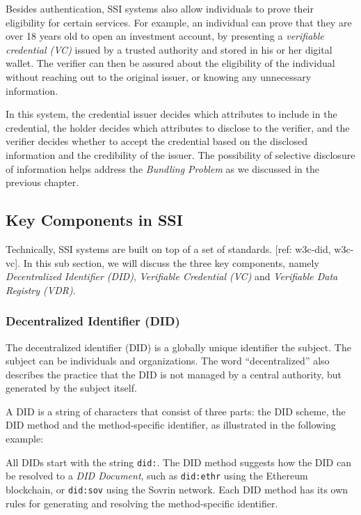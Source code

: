 \documentclass[
]{report}
\begin{document}
Besides authentication, SSI systems also allow individuals to prove their
eligibility for certain services. For example, an individual can prove
that they are over 18 years old to open an investment account, by
presenting a \emph{verifiable credential (VC)} issued by a trusted
authority and stored in his or her digital wallet. The verifier can
then be assured about the eligibility of the individual without reaching
out to the original issuer, or knowing any unnecessary information.

In this system, the credential issuer decides which attributes to include in
the credential, the holder decides which attributes to disclose to the verifier,
and the verifier decides whether to accept the credential based on the disclosed
information and the credibility of the issuer. The possibility of selective
disclosure of information helps address the \emph{Bundling Problem} as we
discussed in the previous chapter.

\subsection{Key Components in SSI}
Technically, SSI systems are built on top of a set of standards. [ref: w3c-did, w3c-vc]. 
In this sub section, we will discuss the three key components, namely
\emph{Decentralized Identifier (DID)}, \emph{Verifiable Credential (VC)} and
\emph{Verifiable Data Registry (VDR)}.
\subsubsection{Decentralized Identifier (DID)}
The decentralized identifier (DID) is a globally unique identifier the subject.
The subject can be individuals and organizations. The word ``decentralized'' 
also describes the practice that the DID is not managed by a central authority,
but generated by the subject itself.

A DID is a string of characters that consist of three parts: the DID scheme,
the DID method and the method-specific identifier, as illustrated in the
following example:
\begin{figure}[h]
  
  \centering
\end{figure}
All DIDs start with the string \texttt{did:}. The DID method suggests how the
DID can be resolved to a \emph{DID Document}, such as \texttt{did:ethr} using
the Ethereum blockchain, or \texttt{did:sov} using the Sovrin network.
Each DID method has its own rules for generating and resolving the 
method-specific identifier.
\end{document}
